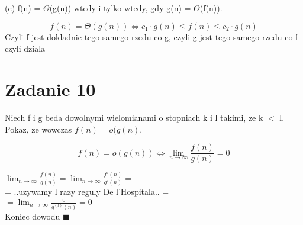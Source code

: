 \documentclass{article}
\renewcommand{\qedsymbol}{$\blacksquare$}
\begin{document}
(c) f(n) = $\Theta$(g(n)) wtedy i tylko wtedy, gdy g(n) = $\Theta$(f(n)).
\begin{center}
$$ f(n) = \Theta(g(n)) \Leftrightarrow c_1\cdot g(n) \leq f(n) \leq c_2\cdot g(n)$$
Czyli f  jest dokladnie tego samego rzedu co g, czyli g jest tego samego rzedu co f czyli dziala
\end{center}


\newpage
\section{Zadanie 10}
Niech f i g beda dowolnymi wielomianami o stopniach k i l takimi, ze k $<$ l.\\
Pokaz, ze wowczas $f(n) = o(g(n)$.

$$f(n) = o(g(n)) \Leftrightarrow \lim_{n \to \infty} \frac{f(n)}{g(n)} = 0$$
\begin{center}
$ \lim_{n \to \infty} \frac{f(n)}{g(n)} = \lim_{n \to \infty} \frac{f'(n)}{g'(n)} = $\\ = ..uzywamy l razy reguly De l'Hospitala.. = \\ $ =  \lim_{n \to \infty} \frac{0}{g^{(l)}(n)} = 0$\\
Koniec dowodu \qedsymbol
\end{center}
\end{document}
